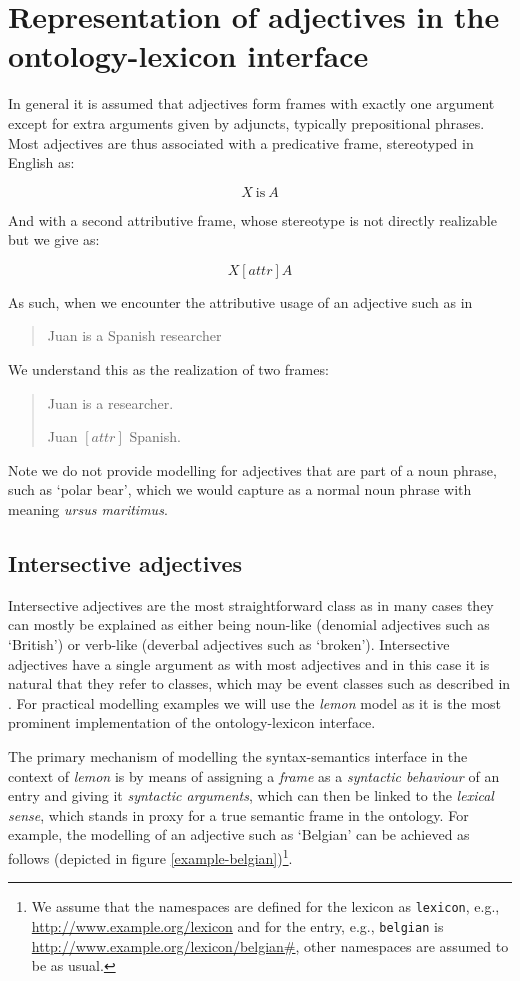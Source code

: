 \documentclass[11pt]{article}
\begin{document}
\section{Representation of adjectives in the ontology-lexicon interface}

In general it is assumed that adjectives form frames with exactly one argument 
except for extra arguments given by adjuncts, typically prepositional phrases. 
Most adjectives are thus associated with a predicative frame, stereotyped in 
English as:

$$X\mathrm{~is~}A$$

And with a second attributive frame, whose stereotype is not directly 
realizable but we give as:

$$X [attr] A$$

As such, when we encounter the attributive usage of an adjective such as in

\begin{quote}
Juan is a Spanish researcher
\end{quote}

We understand this as the realization of two frames:

\begin{quote}
Juan is a researcher.

Juan $[attr]$ Spanish.
\end{quote}

Note we do not provide modelling for adjectives that are part of a noun phrase,
such as `polar bear', which we would capture as a normal noun phrase with 
meaning \emph{ursus maritimus}.

\subsection{Intersective adjectives}

Intersective adjectives are the most straightforward class as in many cases they 
can mostly be explained as either being noun-like (denomial adjectives such as 
`British') or verb-like (deverbal adjectives such as `broken'). Intersective 
adjectives have a single argument as with most adjectives and in this case it is 
natural that they refer to classes, which may be event classes such as described 
in \cite{mccrae2014design}. For practical modelling examples we will use the
\emph{lemon} model as it is the most prominent implementation of the 
ontology-lexicon interface.

The primary mechanism of modelling the syntax-semantics interface in the context 
of \emph{lemon} is by means of assigning a \emph{frame} as a \emph{syntactic 
behaviour} of an entry and giving it \emph{syntactic arguments}, which can then 
be linked to the \emph{lexical sense}, which stands in proxy for a true semantic 
frame in the ontology. For example, the modelling of an adjective such as 
`Belgian' can be achieved as follows (depicted in figure 
\ref{example-belgian})\footnote{We assume that the namespaces are defined for 
the lexicon as {\tt lexicon}, e.g., \url{http://www.example.org/lexicon}
and for the entry, e.g., {\tt belgian} is \url{http://www.example.org/lexicon/belgian#},
other namespaces are assumed to be as usual.}.
\end{document}
